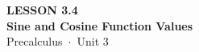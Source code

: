 \documentclass[aspectratio=169, 11pt]{beamer}
\begin{document}
{
\begin{frame}[plain]
  \vspace{2.8cm}\hspace{0.55cm}%
  \begin{minipage}{0.9\textwidth}
    {\color{goldacc}\bfseries\small LESSON 3.4}\\[0.5cm]
    {\color{white}\bfseries\LARGE Sine and Cosine Function Values}\\[1.2cm]
    {\color{skymid}\small Precalculus~$\cdot$~Unit 3}
  \end{minipage}
\end{frame}
}

\begin{frame}[t, plain]
\end{frame}
\end{document}
